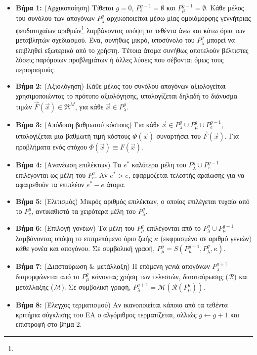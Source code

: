 \begin{itemize}

\item[]{\bf Βήμα 1:} (Αρχικοποίηση) Τίθεται $g\!=\!0$, $P_{e}^{g-1}= \emptyset$ και $P_{\mu}^{g-1}= \emptyset$.
	Κάθε μέλος του συνόλου των απογόνων $P_{\lambda}^g$
	αρχικοποιείται μέσω μίας ομοιόμορφης
	γεννήτριας ψευδοτυχαίων αριθμών\footnote{
	}	λαμβάνοντας υπόψη τα τεθέντα άνω
	και κάτω όρια των μεταβλητών σχεδιασμού. Ένα, συνήθως μικρό, υποσύνολο του $P_{\lambda}^g$ μπορεί να επιβληθεί εξωτερικά από το χρήστη. Τέτοια άτομα συνήθως αποτελούν βέλτιστες λύσεις παρόμοιων προβλημάτων ή άλλες λύσεις που σέβονται όμως τους περιορισμούς.      

\item[]{\bf Βήμα 2:} (Αξιολόγηση) Κάθε μέλος του συνόλου απογόνων αξιολογείται χρησιμοποιώντας
	το πρότυπο αξιολόγησης, υπολογίζεται δηλαδή το διάνυσμα τιμών
	$\vec{F}(\vec{x}) \in \Re^{M}$, για κάθε $\vec{x} \in P_{\lambda}^g$.
\item[]{\bf Βήμα 3:} (Απόδοση βαθμωτού κόστους) Για κάθε $\vec{x} \in P_{\lambda}^g \cup P_{\mu}^g \cup P_{e}^{g-1}$, υπολογίζεται μια βαθμωτή τιμή κόστους $\Phi(\vec{x})$ συναρτήσει του $\vec{F}(\vec{x})$. Για προβλήματα ενός στόχου $\Phi(\vec{x}) \equiv F(\vec{x})$.
\item[]{\bf Βήμα 4:} (Ανανέωση επιλέκτων) Τα $e^*$ καλύτερα μέλη του $P_{\lambda}^g \cup P_{e}^{g-1}$ επιλέγονται ως μέλη του $P_e^g$. Αν $e^*\!>\!e$, εφαρμόζεται τελεστής αραίωσης \cite{phd_Giotis} για να αφαιρεθούν τα επιπλέον $e^*\!-\!e$ άτομα.     
\item[]{\bf Βήμα 5:} (Ελιτισμός) Μικρός αριθμός επιλέκτων, ο οποίος επιλέγεται τυχαία από το $P_e^g$, αντικαθιστά τα χειρότερα μέλη του $P_{\lambda}^g$.     
\item[]{\bf Βήμα 6:} (Επιλογή γονέων) Τα μέλη του $P_{\mu}^g$ επιλέγονται από το $P_{\lambda}^g \cup P_{\mu}^{g-1}$ λαμβάνοντας υπόψη το επιτρεπόμενο όριο ζωής $\kappa$ (εκφρασμένο σε αριθμό γενιών) κάθε γονέα και απογόνου. Σε συμβολική γραφή, $P_{\mu}^{g}=S(P_{\mu}^{g-1},P_{\lambda}^g,\kappa)$.  
\item[]{\bf Βήμα 7:} (Διασταύρωση \& μετάλλαξη) Η επόμενη γενιά απογόνων $P_{\lambda}^{g+1}$ διαμορφώνεται από το $P_{\mu}^{g}$ κάνοντας χρήση των τελεστών, διασταύρωσης ($\mathcal{R}$) και μετάλλαξης ($\mathcal{M}$). Σε συμβολική γραφή, $P_{\lambda}^{g+1} =\mathcal{M}(\mathcal{R}(P_{\mu}^{g}))$.
\item[]{\bf Βήμα 8:} (Έλεγχος τερματισμού) Αν ικανοποιείται κάποιο από τα τεθέντα κριτήρια σύγκλισης του ΕΑ ο αλγόριθμος τερματίζεται, αλλιώς $g\leftarrow g+1$ και επιστροφή στο βήμα 2.

\end{itemize}

